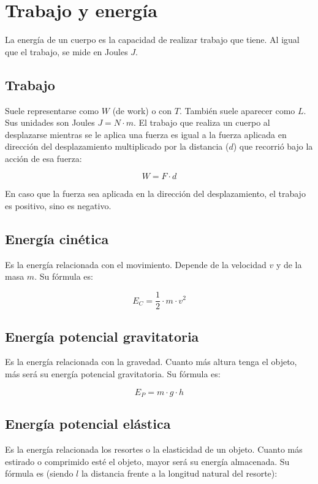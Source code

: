 \section{Trabajo y energía}

La energía de un cuerpo es la capacidad de realizar trabajo que tiene. Al igual que el trabajo, se mide en Joules $J$.


\subsection*{Trabajo}
    
Suele representarse como $W$ (de work) o con $T$. También suele aparecer como $L$. Sus unidades son Joules $J=N\cdot m$. El trabajo que realiza un cuerpo al desplazarse mientras se le aplica una fuerza es igual a la fuerza aplicada en dirección del desplazamiento multiplicado por la distancia ($d$) que recorrió bajo la acción de esa fuerza:

$$W=F\cdot d$$

En caso que la fuerza sea aplicada en la dirección del desplazamiento, el trabajo es positivo, sino es negativo.


\subsection*{Energía cinética}

Es la energía relacionada con el movimiento. Depende de la velocidad $v$ y de la masa $m$. Su fórmula es:

$$E_C=\dfrac{1}{2}\cdot m \cdot v^2$$


\subsection*{Energía potencial gravitatoria}

Es la energía relacionada con la gravedad. Cuanto más altura tenga el objeto, más será su energía potencial gravitatoria. Su fórmula es:

$$
E_P = m\cdot g \cdot h
$$


\subsection*{Energía potencial elástica}

Es la energía relacionada los resortes o la elasticidad de un objeto. Cuanto más estirado o comprimido esté el objeto, mayor será su energía almacenada. Su fórmula es (siendo $l$ la distancia frente a la longitud natural del resorte):

